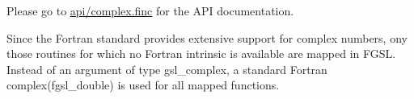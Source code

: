 Please go to \hyperlink{complex_8finc}{api/complex.\-finc} for the A\-P\-I documentation.

Since the Fortran standard provides extensive support for complex numbers, ony those routines for which no Fortran intrinsic is available are mapped in F\-G\-S\-L. Instead of an argument of type {\ttfamily gsl\-\_\-complex}, a standard Fortran {\ttfamily complex(fgsl\-\_\-double)} is used for all mapped functions. 
